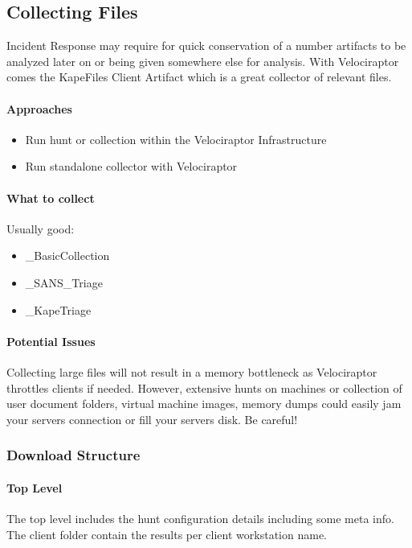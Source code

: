 \subsection{Collecting Files}
Incident Response may require for quick conservation of a number artifacts to be analyzed later on or being given somewhere else for analysis. 
With Velociraptor comes the KapeFiles Client Artifact which is a great collector of relevant files.

\paragraph{Approaches}
\begin{itemize}
  \item Run hunt or collection within the Velociraptor Infrastructure
  \item Run standalone collector with Velociraptor
\end{itemize}

\paragraph{What to collect}
Usually good:
\begin{itemize}
  \item \_BasicCollection
  \item \_SANS\_Triage
  \item \_KapeTriage
\end{itemize}

\paragraph{Potential Issues}
Collecting large files will not result in a memory bottleneck as Velociraptor throttles clients if needed. However, extensive hunts on machines or collection of user document folders, virtual machine images, memory dumps could easily jam your servers connection or fill your servers disk. Be careful!

\subsubsection{Download Structure}
\paragraph{Top Level}
The top level includes the hunt configuration details including some meta info.
The client folder contain the results per client workstation name.

